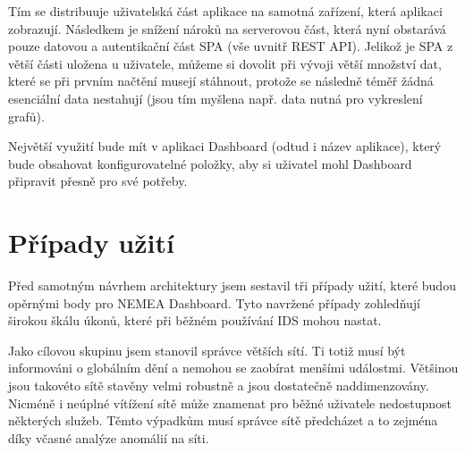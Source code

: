 Tím se distribuuje uživatelská část aplikace na samotná zařízení, která aplikaci zobrazují. Následkem je snížení nároků na serverovou část, která nyní obstarává pouze datovou a autentikační část SPA (vše uvnitř REST API). Jelikož je SPA z větší části uložena u uživatele, můžeme si dovolit při vývoji větší množství dat, které se při prvním načtění musejí stáhnout, protože se následně téměř žádná esenciální data nestahují (jsou tím myšlena např. data nutná pro vykreslení grafů).

Největší využití bude mít v aplikaci Dashboard (odtud i název aplikace), který bude obsahovat konfigurovatelné položky, aby si uživatel mohl Dashboard připravit přesně pro své potřeby.

\section{Případy užití}
Před samotným návrhem architektury jsem sestavil tři případy užití, které budou opěrnými body pro NEMEA Dashboard. Tyto navržené případy zohledňují širokou škálu úkonů, které při běžném používání IDS mohou nastat.

Jako cílovou skupinu jsem stanovil správce větších sítí. Ti totiž musí být informováni o globálním dění a nemohou se zaobírat menšími událostmi. Většinou jsou takovéto sítě stavěny velmi robustně a jsou dostatečně naddimenzovány. Nicméně i neúplné vítížení sítě může znamenat pro běžné uživatele nedostupnost některých služeb. Těmto výpadkům musí správce sítě předcházet a to zejména díky včasné analýze anomálií na síti.

